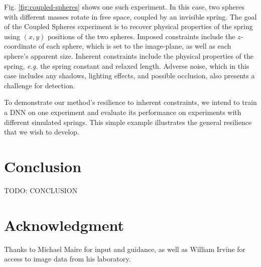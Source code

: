 \documentclass[10pt, journal]{IEEEtran}
\begin{document}
Fig. \ref{fig:coupled-spheres} shows one such experiment. In this case, two
spheres with different masses rotate in free space, coupled by an invisible
spring. The goal of the Coupled Spheres experiment is to recover physical
properties of the spring using $(x,y)$ positions of the two spheres. Imposed
constraints include the $z$-coordinate of each sphere, which is set to the
image-plane, as well as each sphere's apparent size. Inherent constraints
include the physical properties of the spring, \textit{e.g.} the spring constant
and relaxed length. Adverse noise, which in this case includes any shadows,
lighting effects, and possible occlusion, also presents a challenge for
detection.

To demonstrate our method's resilience to inherent constraints, we intend to
train a DNN on one experiment and evaluate its performance on experiments with
different simulated springs. This simple example illustrates the general
resilience that we wish to develop.

\section{Conclusion}
\label{sec:conclusion}

TODO: CONCLUSION

\section*{Acknowledgment}
\label{sec:acknowledgment}

Thanks to Michael Maire for input and guidance, as well as William Irvine for
access to image data from his laboratory.



\end{document}
